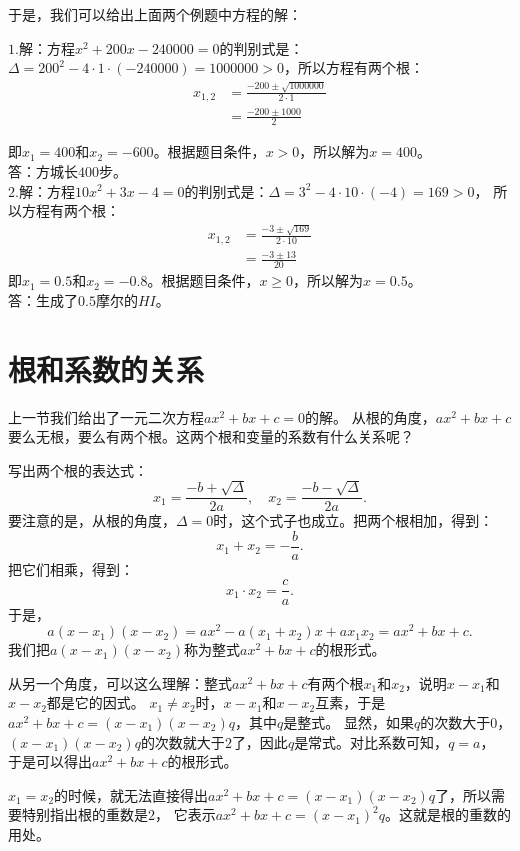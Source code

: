 \documentclass[12pt,UTF8,fontset=none]{ctexbook}
\begin{document}
于是，我们可以给出上面两个例题中方程的解：
\begin{so}
    $1.$解：方程$ x^2 + 200x - 240000 = 0$的判别式是：
    $\Delta = 200^2 - 4\cdot 1\cdot (-240000) = 1000000 > 0$，所以方程有两个根：
    \begin{align*}
        x_{1,2} &= \frac{-200 \pm \sqrt{1000000}}{2\cdot 1}  \\
        &= \frac{-200 \pm 1000}{2} 
    \end{align*}

    即$x_1 = 400$和$x_2 = -600$。根据题目条件，$x>0$，所以解为$x = 400$。\\
    答：方城长$400$步。\\
    $2.$解：方程$10x^2 + 3x - 4 = 0$的判别式是：$\Delta = 3^2 - 4\cdot 10\cdot (-4) = 169 > 0$，
    所以方程有两个根：
    \begin{align*}
        x_{1,2} &= \frac{-3 \pm \sqrt{169}}{2\cdot 10}  \\
        &= \frac{-3 \pm 13}{20} 
    \end{align*}
    即$x_1 = 0.5$和$x_2 = -0.8$。根据题目条件，$x\geqslant 0$，所以解为$x = 0.5$。\\
    答：生成了$0.5$摩尔的$HI$。
\end{so}

\section{根和系数的关系}

上一节我们给出了一元二次方程$ax^2 + bx + c = 0$的解。
从根的角度，$ax^2 + bx + c $要么无根，要么有两个根。这两个根和变量的系数有什么关系呢？

写出两个根的表达式：
$$x_{1} = \frac{-b + \sqrt{\Delta}}{2a},\quad x_{2} = \frac{-b - \sqrt{\Delta}}{2a}.$$
要注意的是，从根的角度，$\Delta = 0$时，这个式子也成立。把两个根相加，得到：
$$ x_1 + x_2 = -\frac{b}{a}.$$
把它们相乘，得到：
$$ x_1 \cdot x_2 = \frac{c}{a}.$$
于是，
$$a(x - x_1)(x - x_2) = ax^2 - a(x_1 + x_2)x + ax_1x_2 = ax^2 + bx+c.$$
我们把$a(x - x_1)(x - x_2)$称为整式$ax^2 + bx+c$的根形式。

从另一个角度，可以这么理解：整式$ax^2 + bx + c$有两个根$x_1$和$x_2$，说明$x - x_1$和$x - x_2$都是它的因式。
$x_1 \neq x_2$时，$x - x_1$和$x - x_2$互素，于是$ax^2 + bx + c = (x - x_1)(x-x_2)q$，其中$q$是整式。
显然，如果$q$的次数大于$0$，$(x - x_1)(x-x_2)q$的次数就大于$2$了，因此$q$是常式。对比系数可知，$q = a$，
于是可以得出$ax^2 + bx+c$的根形式。

$x_1 = x_2$的时候，就无法直接得出$ax^2 + bx + c = (x - x_1)(x-x_2)q$了，所以需要特别指出根的重数是$2$，
它表示$ax^2 + bx + c = (x - x_1)^2 q$。这就是根的重数的用处。
\end{document}
